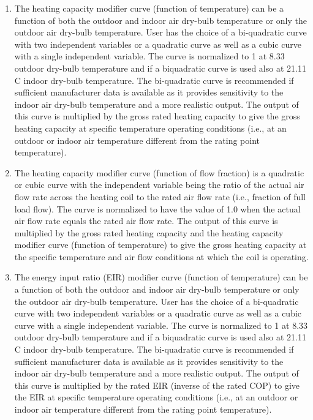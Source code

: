 \begin{enumerate}
\def\labelenumi{\arabic{enumi})}
\item
  The heating capacity modifier curve (function of temperature) can be a function of both the outdoor and indoor air dry-bulb temperature or only the outdoor air dry-bulb temperature. User has the choice of a bi-quadratic curve with two independent variables or a quadratic curve as well as a cubic curve with a single independent variable. The curve is normalized to 1 at 8.33 outdoor dry-bulb temperature and if a biquadratic curve is used also at 21.11 C indoor dry-bulb temperature. The bi-quadratic curve is recommended if sufficient manufacturer data is available as it provides sensitivity to the indoor air dry-bulb temperature and a more realistic output. The output of this curve is multiplied by the gross rated heating capacity to give the gross heating capacity at specific temperature operating conditions (i.e., at an outdoor or indoor air temperature different from the rating point temperature).
\item
  The heating capacity modifier curve (function of flow fraction) is a quadratic or cubic curve with the independent variable being the ratio of the actual air flow rate across the heating coil to the rated air flow rate (i.e., fraction of full load flow). The curve is normalized to have the value of 1.0 when the actual air flow rate equals the rated air flow rate. The output of this curve is multiplied by the gross rated heating capacity and the heating capacity modifier curve (function of temperature) to give the gross heating capacity at the specific temperature and air flow conditions at which the coil is operating.
\item
  The energy input ratio (EIR) modifier curve (function of temperature) can be a function of both the outdoor and indoor air dry-bulb temperature or only the outdoor air dry-bulb temperature. User has the choice of a bi-quadratic curve with two independent variables or a quadratic curve as well as a cubic curve with a single independent variable. The curve is normalized to 1 at 8.33 outdoor dry-bulb temperature and if a biquadratic curve is used also at 21.11 C indoor dry-bulb temperature. The bi-quadratic curve is recommended if sufficient manufacturer data is available as it provides sensitivity to the indoor air dry-bulb temperature and a more realistic output. The output of this curve is multiplied by the rated EIR (inverse of the rated COP) to give the EIR at specific temperature operating conditions (i.e., at an outdoor or indoor air temperature different from the rating point temperature).

\end{enumerate}
